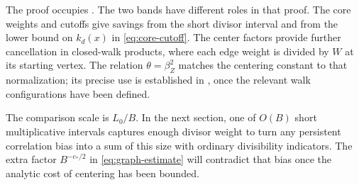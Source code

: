 The proof occupies .
The two bands have different roles in that proof. The core weights and
cutoffs give savings from the short divisor interval and from the
lower bound on $k_d(x)$ in \eqref{eq:core-cutoff}.
The center factors provide further cancellation in closed-walk products,
where each edge weight is divided by $W$ at its starting vertex.
The relation $\theta=\beta_Z^2$ matches the
centering constant to that normalization; its precise use is established
in , once the relevant walk configurations have
been defined.

The comparison scale is $L_0/B$. In the next section, one of $O(B)$
short multiplicative intervals captures enough divisor weight to turn
any persistent correlation bias into a sum of this size with ordinary
divisibility indicators. The extra factor $B^{-c_*/2}$ in
\eqref{eq:graph-estimate} will contradict that
bias once the analytic cost of centering has been bounded.
